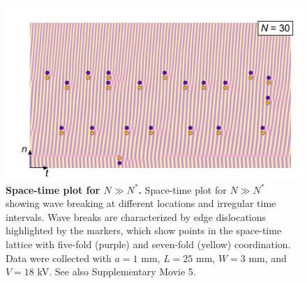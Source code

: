 \begin{appendices}
\begin{figure}[p] 
    \centering
    \includegraphics{figures/A2_SI4.pdf}
    \caption{\textbf{Space-time plot for $N\gg N^*$.} Space-time plot for  $N\gg N^*$ showing wave breaking at different locations and irregular time intervals. Wave breaks are characterized by edge dislocations highlighted by the markers, which show points in the space-time lattice with five-fold (purple) and seven-fold (yellow) coordination. Data were collected with $a=1$ mm, $L=25$ mm, $W=3$ mm, and $V=18$ kV. See also Supplementary Movie 5.}
    \label{fig:SI4}
\end{figure}


\end{appendices}
